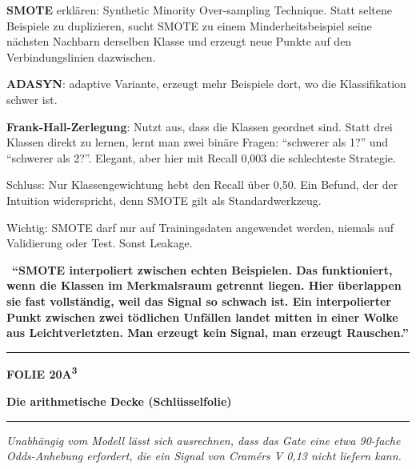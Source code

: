 \documentclass[9pt]{extarticle}
\newcommand{\karte}[3]{%
  \clearpage
  {\color{Accent}\rule{\linewidth}{2.4pt}}\par\vspace{2.5pt}
  {\fontsize{8}{9}\selectfont\bfseries\color{Accent}%
   FOLIE #1\hspace{1.2em}\textbar\hspace{1.2em}#2}\par\vspace{1pt}
  {\fontsize{16}{18}\selectfont\bfseries\color{AccentDark}#3}\par\vspace{3pt}
  {\color{Accent!45}\rule{\linewidth}{0.5pt}}\par\vspace{4pt}%
}
\newcommand{\rubrik}[1]{%
  \vspace{3.5pt}{\fontsize{7.5}{8.5}\selectfont\bfseries\color{Grau}%
  \MakeUppercase{#1}}\par\vspace{1.5pt}}
\newcommand{\kernsatz}[1]{%
  \begin{tcolorbox}[enhanced,sharp corners,boxrule=0pt,
    leftrule=2.2pt,colframe=Accent,colback=AccentPale,
    left=5pt,right=5pt,top=3.5pt,bottom=3.5pt,before skip=1pt,after skip=2pt]
    \color{AccentDark}\itshape #1
  \end{tcolorbox}}
\newcommand{\merksatz}[1]{%
  \vspace{2pt}{\color{KSI}$\blacktriangleright$}\ \textbf{\color{KSI}#1}\par}
\begin{document}
\rubrik{Sagen}
\begin{sag}
  \item \textbf{SMOTE} erklären: Synthetic Minority Over-sampling Technique. Statt seltene
        Beispiele zu duplizieren, sucht SMOTE zu einem Minderheitsbeispiel seine nächsten
        Nachbarn derselben Klasse und erzeugt neue Punkte auf den Verbindungslinien dazwischen.
  \item \textbf{ADASYN}: adaptive Variante, erzeugt mehr Beispiele dort, wo die Klassifikation
        schwer ist.
  \item \textbf{Frank-Hall-Zerlegung}: Nutzt aus, dass die Klassen geordnet sind. Statt drei
        Klassen direkt zu lernen, lernt man zwei binäre Fragen: \enquote{schwerer als 1?} und
        \enquote{schwerer als 2?}. Elegant, aber hier mit Recall 0,003 die schlechteste Strategie.
  \item Schluss: Nur Klassengewichtung hebt den Recall über 0,50. Ein Befund, der der Intuition
        widerspricht, denn SMOTE gilt als Standardwerkzeug.
  \item Wichtig: SMOTE darf nur auf Trainingsdaten angewendet werden, niemals auf Validierung
        oder Test. Sonst Leakage.
\end{sag}

\merksatz{\enquote{SMOTE interpoliert zwischen echten Beispielen. Das funktioniert, wenn die
Klassen im Merkmalsraum getrennt liegen. Hier überlappen sie fast vollständig, weil das Signal
so schwach ist. Ein interpolierter Punkt zwischen zwei tödlichen Unfällen landet mitten in einer
Wolke aus Leichtverletzten. Man erzeugt kein Signal, man erzeugt Rauschen.}}

\karte{20}{A\textsuperscript{3}}{Die arithmetische Decke \textnormal{\small(Schlüsselfolie)}}

\kernsatz{Unabhängig vom Modell lässt sich ausrechnen, dass das Gate eine etwa 90-fache
Odds-Anhebung erfordert, die ein Signal von Cram\'ers V 0,13 nicht liefern kann.}
\end{document}
